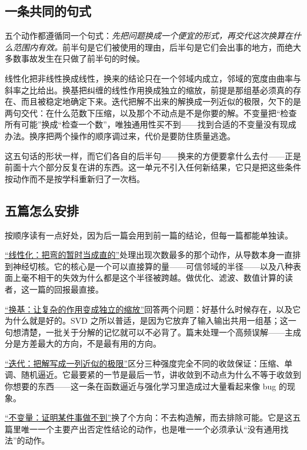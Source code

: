 \subsection{一条共同的句式}

五个动作都遵循同一个句式：\emph{先把问题换成一个便宜的形式，再交代这次换算在什么范围内有效。}前半句是它们被使用的理由，后半句是它们会出事的地方，而绝大多数事故发生在只做了前半句的时候。

线性化把非线性换成线性，换来的结论只在一个邻域内成立，邻域的宽度由曲率与斜率之比给出。换基把纠缠的线性作用换成独立的缩放，前提是那组基必须真的存在、而且被稳定地确定下来。迭代把解不出来的解换成一列近似的极限，欠下的是两句交代：在什么范数下压缩，以及那个不动点是不是你要的解。不变量把``检查所有可能''换成``检查一个数''，唯独通用性买不到——找到合适的不变量没有现成办法。换序把两个操作的顺序调过来，代价是要防住质量逃逸。

这五句话的形状一样，而它们各自的后半句——换来的方便要拿什么去付——正是前面十六个部分反复在讲的东西。这一单元不引入任何新结果，它只是把这些条件按动作而不是按学科重新归了一次档。

\subsection{五篇怎么安排}

按顺序读有一点好处，因为后一篇会用到前一篇的结论，但每一篇都能单独读。

\hyperref[sec:18-Synthesis/02-Recurring-Ideas/01]{``线性化：把弯的暂时当成直的''}处理出现次数最多的那个动作，从导数本身一直排到神经切核。它的核心是一个可以直接算的量——可信邻域的半径——以及八种表面上毫不相干的失效为什么都是这个半径被跨越。做优化、滤波、数值计算的读者，这一篇的回报最直接。

\hyperref[sec:18-Synthesis/02-Recurring-Ideas/02]{``换基：让复杂的作用变成独立的缩放''}回答两个问题：好基什么时候存在，以及它为什么就是好的。SVD 之所以普适，是因为它放弃了输入输出共用一组基；这一句想清楚，一批关于分解的记忆就可以不必背了。篇末处理一个高频误解——主成分是方差最大的方向，不是最有用的方向。

\hyperref[sec:18-Synthesis/02-Recurring-Ideas/03]{``迭代：把解写成一列近似的极限''}区分三种强度完全不同的收敛保证：压缩、单调、随机逼近。它最要紧的一节是最后一节，讲收敛到不动点为什么不等于收敛到你想要的东西——这一条在函数逼近与强化学习里造成过大量看起来像 bug 的现象。

\hyperref[sec:18-Synthesis/02-Recurring-Ideas/04]{``不变量：证明某件事做不到''}换了个方向：不去构造解，而去排除可能。它是这五篇里唯一一个主要产出否定性结论的动作，也是唯一一个必须承认``没有通用找法''的动作。

